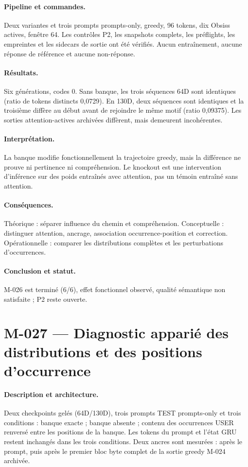\documentclass[11pt,a4paper]{report}
\begin{document}
\paragraph{Pipeline et commandes.} Deux variantes et trois prompts prompts-only, greedy, 96 tokens, dix Obsiss actives, fenêtre 64. Les contrôles P2, les snapshots complets, les préflights, les empreintes et les sidecars de sortie ont été vérifiés. Aucun entraînement, aucune réponse de référence et aucune non-réponse.
\paragraph{Résultats.} Six générations, codes 0. Sans banque, les trois séquences 64D sont identiques (ratio de tokens distincts 0,0729). En 130D, deux séquences sont identiques et la troisième diffère au début avant de rejoindre le même motif (ratio 0,09375). Les sorties attention-actives archivées diffèrent, mais demeurent incohérentes.
\paragraph{Interprétation.} La banque modifie fonctionnellement la trajectoire greedy, mais la différence ne prouve ni pertinence ni compréhension. Le knockout est une intervention d'inférence sur des poids entraînés avec attention, pas un témoin entraîné sans attention.
\paragraph{Conséquences.} Théorique : séparer influence du chemin et compréhension. Conceptuelle : distinguer attention, ancrage, association occurrence-position et correction. Opérationnelle : comparer les distributions complètes et les perturbations d'occurrences.
\paragraph{Conclusion et statut.} M-026 est terminé (6/6), effet fonctionnel observé, qualité sémantique non satisfaite ; P2 reste ouverte.


\section{M-027 — Diagnostic apparié des distributions et des positions d'occurrence}
\label{sec:m027-paired-logits}
\paragraph{Description et architecture.} Deux checkpoints gelés (64D/130D), trois prompts TEST prompts-only et trois conditions : banque exacte ; banque absente ; contenu des occurrences USER renversé entre les positions de la banque. Les tokens du prompt et l'état GRU restent inchangés dans les trois conditions. Deux ancres sont mesurées : après le prompt, puis après le premier bloc byte complet de la sortie greedy M-024 archivée.
\end{document}
